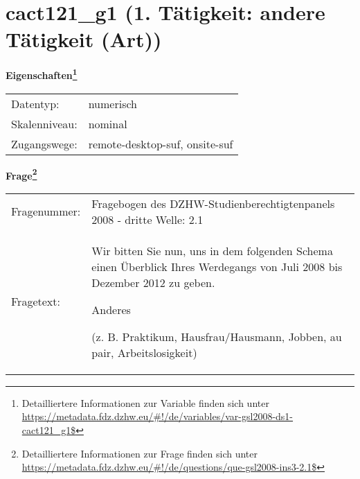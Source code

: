 
    \setcounter{footnote}{0}

    \vspace*{-1.8cm}
	\section{cact121\_g1 (1. Tätigkeit: andere Tätigkeit (Art))}
	\label{section:cact121_g1}



    \vspace*{0.5cm}
    \noindent\textbf{Eigenschaften\footnote{Detailliertere Informationen zur Variable finden sich unter
		\url{https://metadata.fdz.dzhw.eu/\#!/de/variables/var-gsl2008-ds1-cact121_g1$}}}\\
	\begin{tabularx}{\hsize}{@{}lX}
	Datentyp: & numerisch \\
	Skalenniveau: & nominal \\
	Zugangswege: &
	  remote-desktop-suf, 
	  onsite-suf
 \\
    \end{tabularx}



				\vspace*{0.5cm}
                \noindent\textbf{Frage\footnote{Detailliertere Informationen zur Frage finden sich unter
		              \url{https://metadata.fdz.dzhw.eu/\#!/de/questions/que-gsl2008-ins3-2.1$}}}\\
				\begin{tabularx}{\hsize}{@{}lX}
					Fragenummer: &
					  Fragebogen des DZHW-Studienberechtigtenpanels 2008 - dritte Welle:
					  2.1
 \\
					Fragetext: & Wir bitten Sie nun, uns in dem folgenden Schema einen Überblick Ihres Werdegangs von Juli 2008 bis Dezember 2012 zu geben.\par  Anderes\par  (z. B. Praktikum, Hausfrau/Hausmann, Jobben, au pair, Arbeitslosigkeit) \\
				\end{tabularx}





